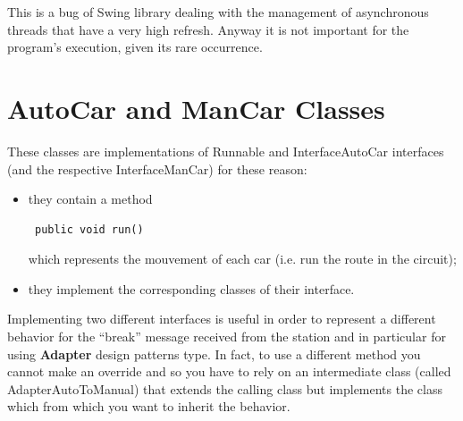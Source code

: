 \documentclass[a4paper,titlepage]{article}
\begin{document}
This is a bug of Swing library dealing with the management of asynchronous threads that have a very high refresh. Anyway it is not important for the program's execution, given its rare occurrence.

\newpage

\part{AutoCar and ManCar Classes}

These classes are implementations of Runnable and InterfaceAutoCar interfaces (and the respective InterfaceManCar) for these reason:

\begin {itemize}

\item they contain a method \begin{verbatim} public void run() \end{verbatim} which represents the mouvement of each car (i.e. run the route in the circuit);

\item they implement the corresponding classes of their interface.

\end {itemize}

Implementing two  different interfaces is useful in order to represent a different behavior for the ``break'' message received from the station and in particular for using \textbf{Adapter} design patterns type. In fact, to use a different method you cannot make an override and so you have to rely on an intermediate class (called AdapterAutoToManual) that extends the calling class but implements the class which from which you want to inherit the behavior.
\end{document}
